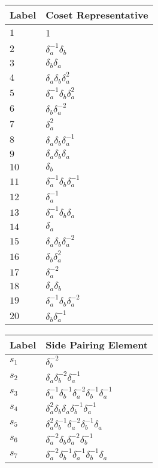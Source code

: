 \documentclass{article}
\begin{document}
\begin{center}
\begin{tabular}{ll}
\toprule
Label & Coset Representative\\
\midrule
$1$ & 1 \\
$2$ & $\delta_a^{-1}\delta_b^{}$ \\
$3$ & $\delta_b^{}\delta_a^{}$ \\
$4$ & $\delta_a^{}\delta_b^{}\delta_a^{2}$ \\
$5$ & $\delta_a^{-1}\delta_b^{}\delta_a^{2}$ \\
$6$ & $\delta_b^{}\delta_a^{-2}$ \\
$7$ & $\delta_a^{2}$ \\
$8$ & $\delta_a^{}\delta_b^{}\delta_a^{-1}$ \\
$9$ & $\delta_a^{}\delta_b^{}\delta_a^{}$ \\
$10$ & $\delta_b^{}$ \\
$11$ & $\delta_a^{-1}\delta_b^{}\delta_a^{-1}$ \\
$12$ & $\delta_a^{-1}$ \\
$13$ & $\delta_a^{-1}\delta_b^{}\delta_a^{}$ \\
$14$ & $\delta_a^{}$ \\
$15$ & $\delta_a^{}\delta_b^{}\delta_a^{-2}$ \\
$16$ & $\delta_b^{}\delta_a^{2}$ \\
$17$ & $\delta_a^{-2}$ \\
$18$ & $\delta_a^{}\delta_b^{}$ \\
$19$ & $\delta_a^{-1}\delta_b^{}\delta_a^{-2}$ \\
$20$ & $\delta_b^{}\delta_a^{-1}$ \\
\bottomrule
\end{tabular}
\hfill
\begin{tabular}{ll}
\toprule
Label & Side Pairing Element\\
\midrule
$s_{1}$ & $\delta_b^{-2}$ \\
$s_{2}$ & $\delta_a^{}\delta_b^{-2}\delta_a^{-1}$ \\
$s_{3}$ & $\delta_a^{-1}\delta_b^{-1}\delta_a^{-2}\delta_b^{-1}\delta_a^{-1}$ \\
$s_{4}$ & $\delta_a^{2}\delta_b^{}\delta_a^{}\delta_b^{-1}\delta_a^{-1}$ \\
$s_{5}$ & $\delta_a^{2}\delta_b^{-1}\delta_a^{-2}\delta_b^{-1}\delta_a^{}$ \\
$s_{6}$ & $\delta_a^{-2}\delta_b^{}\delta_a^{-2}\delta_b^{-1}$ \\
$s_{7}$ & $\delta_a^{-2}\delta_b^{-1}\delta_a^{-1}\delta_b^{-1}\delta_a^{}$ \\

\end{tabular}
\end{center}
\end{document}

